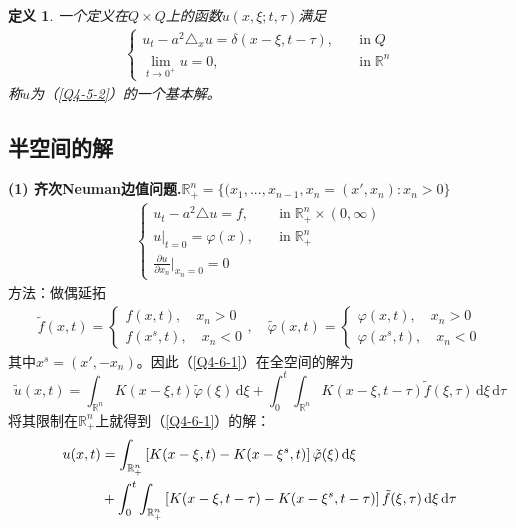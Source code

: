 \documentclass[11pt, a4paper]{article}
\theoremstyle{theorem}
\newtheorem{definition}[thm]{定义}
\newcommand{\intd}[1]{\,\mathrm{d}{#1}}
\begin{document}
\begin{definition}
一个定义在$Q \times Q$上的函数$u(x,\xi; t, \tau)$满足
\begin{align}
    \begin{cases}
    u_t - a^2 \triangle_x u = \delta(x - \xi, t - \tau), \quad &\text{in}\; Q \\
    \lim\limits_{t \rightarrow 0^+} u = 0, \quad &\text{in} \; \mathbb{R}^n
    \end{cases}
\end{align}
称$u$为（\ref{Q4-5-2}）的一个基本解。
\end{definition}

\subsection{半空间的解}

\textbf{(1) 齐次Neuman边值问题.}$\mathbb{R}_+^n = \{(x_1, ..., x_{n-1}, x_n = (x',x_n): x_n > 0\}$
\begin{align}
\label{Q4-6-1}
    \begin{cases}
    u_t - a^2 \triangle u = f, \quad &\text{in} \; \mathbb{R}_+^n \times (0,\infty) \\
    u\bigg|_{t = 0} = \varphi(x), \quad &\text{in} \; \mathbb{R}_+^n \\
    \frac{\partial u}{\partial x_n} \bigg|_{x_n =0} = 0
    \end{cases}
\end{align}
方法：做偶延拓
\begin{align}
    \tilde{f}(x,t) =
    \begin{cases}
        f(x,t), \quad x_n > 0 \\
        f(x^s,t), \quad x_n < 0
    \end{cases}, \quad     \tilde{\varphi}(x,t) =
    \begin{cases}
        \varphi(x,t), \quad x_n > 0 \\
        \varphi(x^s,t), \quad x_n < 0
    \end{cases}
\end{align}
其中$x^s = (x',-x_n)$。因此（\ref{Q4-6-1}）在全空间的解为
$$
    \tilde{u}(x,t) = \int_{\mathbb{R}^n} K(x-\xi, t) \tilde{\varphi}(\xi) \intd \xi + \int_0^t \int_{\mathbb{R}^n} K(x-\xi, t-\tau) \tilde{f}(\xi,\tau) \intd \xi \intd \tau
$$
将其限制在$\mathbb{R}_+^n$上就得到（\ref{Q4-6-1}）的解：
\begin{align}
u(x,t)
&= \int_{\mathbb{R}^n_+} \left[K(x-\xi, t) - K(x-\xi^s,t)\right]\tilde{\varphi}(\xi) \intd \xi \notag\\
&+ \int_0^t \int_{\mathbb{R}^n_+} \left[K(x-\xi, t-\tau) - K(x-\xi^s,t-\tau)\right] \tilde{f}(\xi,\tau) \intd \xi \intd \tau
\end{align}
\end{document}
